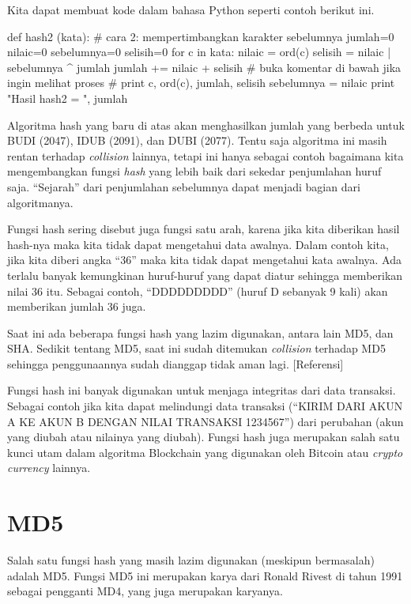 Kita dapat membuat kode dalam bahasa Python seperti contoh berikut ini. 

\begin{python}
def hash2 (kata):
	# cara 2: mempertimbangkan karakter sebelumnya
	jumlah=0
	nilaic=0
	sebelumnya=0
	selisih=0
	for c in kata:
		nilaic = ord(c)
		selisih = nilaic | sebelumnya ^ jumlah
		jumlah += nilaic + selisih
		# buka komentar di bawah jika ingin melihat proses
		# print c, ord(c), jumlah, selisih
		sebelumnya = nilaic
	print "Hasil hash2 = ", jumlah
\end{python}

Algoritma hash yang baru di atas akan menghasilkan jumlah yang berbeda untuk BUDI (2047), IDUB (2091), dan DUBI (2077). Tentu saja algoritma ini masih rentan terhadap {\em collision} lainnya, tetapi ini hanya sebagai contoh bagaimana kita mengembangkan fungsi {\em hash} yang lebih baik dari sekedar penjumlahan huruf saja. ``Sejarah'' dari penjumlahan sebelumnya dapat menjadi bagian dari algoritmanya.

Fungsi hash sering disebut juga fungsi satu arah, karena jika kita diberikan hasil hash-nya maka kita tidak dapat mengetahui data awalnya. Dalam contoh kita, jika kita diberi angka ``36'' maka kita tidak dapat mengetahui kata awalnya. Ada terlalu banyak kemungkinan huruf-huruf yang dapat diatur sehingga memberikan nilai 36 itu. Sebagai contoh, ``DDDDDDDDD'' (huruf D sebanyak 9 kali) akan memberikan jumlah 36 juga.

Saat ini ada beberapa fungsi hash yang lazim digunakan, antara lain MD5, dan SHA. Sedikit tentang MD5, saat ini sudah ditemukan {\em collision} terhadap MD5 sehingga penggunaannya sudah dianggap tidak aman lagi. [Referensi]

Fungsi hash ini banyak digunakan untuk menjaga integritas dari data transaksi. Sebagai contoh jika kita dapat melindungi data transaksi (``KIRIM DARI AKUN A KE AKUN B DENGAN NILAI TRANSAKSI 1234567'') dari perubahan (akun yang diubah atau nilainya yang diubah). Fungsi hash juga merupakan salah satu kunci utam dalam algoritma Blockchain yang digunakan oleh Bitcoin atau {\em crypto currency} lainnya.

\section{MD5}
Salah satu fungsi hash yang masih lazim digunakan (meskipun bermasalah) adalah MD5. Fungsi MD5 ini merupakan karya dari Ronald Rivest di tahun 1991 sebagai pengganti MD4, yang juga merupakan karyanya.

